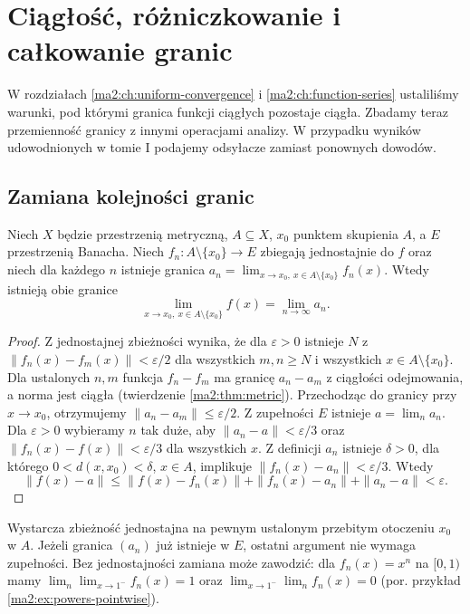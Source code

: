 \chapter{Ciągłość, różniczkowanie i całkowanie granic}
\label{ma2:ch:limits-calculus}

W rozdziałach \ref{ma2:ch:uniform-convergence}
i \ref{ma2:ch:function-series} ustaliliśmy warunki,
pod którymi granica funkcji ciągłych pozostaje
ciągła. Zbadamy teraz przemienność granicy
z innymi operacjami analizy. W przypadku
wyników udowodnionych w tomie I podajemy
odsyłacze zamiast ponownych dowodów.

\section{Zamiana kolejności granic}

\begin{twierdzenie}
\label{ma2:thm:interchange-limits}
Niech $X$ będzie przestrzenią metryczną,
$A\subseteq X$, $x_0$ punktem skupienia $A$,
a $E$ przestrzenią Banacha. Niech
$f_n:A\setminus\{x_0\}\to E$ zbiegają
jednostajnie do $f$ oraz niech dla każdego $n$
istnieje granica $a_n=\lim_{x\to x_0,\ x\in A\setminus\{x_0\}}f_n(x)$.
Wtedy istnieją obie granice
\[
 \lim_{x\to x_0,\ x\in A\setminus\{x_0\}} f(x)
 =\lim_{n\to\infty} a_n.
\]
\end{twierdzenie}
\begin{proof}
Z jednostajnej zbieżności wynika, że dla
$\varepsilon>0$ istnieje $N$ z
$\|f_n(x)-f_m(x)\|<\varepsilon/2$
dla wszystkich $m,n\ge N$ i wszystkich
$x\in A\setminus\{x_0\}$.
Dla ustalonych $n,m$ funkcja $f_n-f_m$ ma
granicę $a_n-a_m$ z ciągłości odejmowania,
a norma jest ciągła (twierdzenie
\ref{ma2:thm:metric}). Przechodząc do granicy
przy $x\to x_0$, otrzymujemy
$\|a_n-a_m\|\le\varepsilon/2$.
Z zupełności $E$ istnieje $a=\lim_n a_n$.
Dla $\varepsilon>0$ wybieramy $n$ tak duże,
aby $\|a_n-a\|<\varepsilon/3$ oraz
$\|f_n(x)-f(x)\|<\varepsilon/3$ dla wszystkich $x$.
Z definicji $a_n$ istnieje $\delta>0$,
dla którego $0<d(x,x_0)<\delta$, $x\in A$,
implikuje $\|f_n(x)-a_n\|<\varepsilon/3$.
Wtedy
\[
 \|f(x)-a\|\le
 \|f(x)-f_n(x)\|+\|f_n(x)-a_n\|+\|a_n-a\|
 <\varepsilon.
\]
\end{proof}
Wystarcza zbieżność jednostajna na pewnym
ustalonym przebitym otoczeniu $x_0$ w $A$.
Jeżeli granica $(a_n)$ już istnieje w $E$,
ostatni argument nie wymaga zupełności.
Bez jednostajności zamiana może zawodzić:
dla $f_n(x)=x^n$ na $[0,1)$ mamy
$\lim_n\lim_{x\to1^-} f_n(x)=1$ oraz
$\lim_{x\to1^-}\lim_n f_n(x)=0$ (por.
przykład \ref{ma2:ex:powers-pointwise}).

